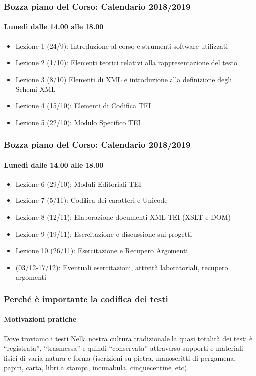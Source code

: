 \begin{frame}
    \frametitle{Bozza piano del Corso: Calendario 2018/2019}
    \framesubtitle{Lunedì dalle 14.00 alle 18.00}
    \addtocounter{nframe}{1}
    
        \begin{itemize}
            \setlength\itemsep{0.5em}
            \item Lezione 1 (24/9): Introduzione al corso e strumenti software utilizzati
            \item Lezione 2 (1/10): Elementi teorici relativi alla rappresentazione del testo
            \item Lezione 3 (8/10) Elementi di XML e introduzione alla definizione degli Schemi XML
            \item Lezione 4 (15/10): Elementi di Codifica TEI
            \item Lezione 5 (22/10): Modulo Specifico TEI
        \end{itemize}

\end{frame}

\begin{frame}
    \frametitle{Bozza piano del Corso: Calendario 2018/2019}
    \framesubtitle{Lunedì dalle 14.00 alle 18.00}
    \addtocounter{nframe}{1}
    
        \begin{itemize}
            \setlength\itemsep{0.5em}
            \item Lezione 6 (29/10): Moduli Editoriali TEI
            \item Lezione 7 (5/11): Codifica dei caratteri e Unicode
            \item Lezione 8 (12/11): Elaborazione documenti XML-TEI (XSLT e DOM)
            \item Lezione 9 (19/11): Esercitazione e discussione sui progetti 
            \item Lezione 10 (26/11): Esercitazione e Recupero Argomenti
            \item (03/12-17/12):  Eventuali esercitazioni, attività laboratoriali, recupero argomenti
        \end{itemize}

\end{frame}

\begin{frame}
    \frametitle{Perché è importante la codifica dei testi}
    \framesubtitle{Motivazioni pratiche}
    \addtocounter{nframe}{1}
    
    \begin{block}{Dove troviamo i testi}
        Nella nostra cultura tradizionale la quasi totalità dei testi è ``registrata'', ``trasmessa'' e quindi ``conservata'' attraverso supporti e materiali fisici di varia natura e forma (iscrizioni su pietra, manoscritti di pergamena, papiri, carta, libri a stampa, incunabula, cinquecentine, etc).
    \end{block}

\end{frame}


